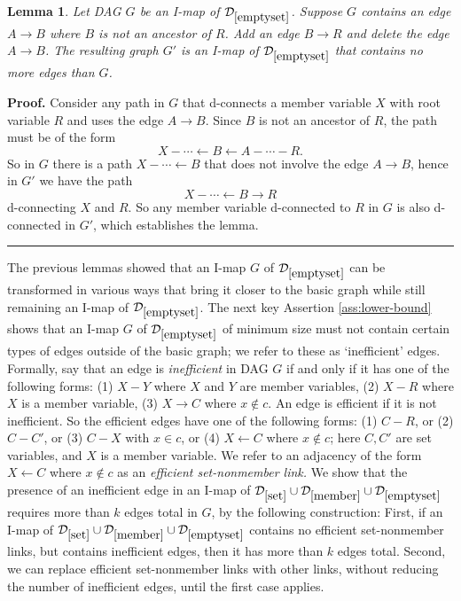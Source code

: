 \documentclass{elsarticle}%
\newtheorem{lemma}[theorem]{Lemma}
\renewenvironment{proof}[1][Proof]{\noindent\textbf{#1.} }{\ \rule{0.5em}{0.5em}}
\newcommand{\A}{A}
\newcommand{\B}{B}
\newcommand{\R}{R}
\newcommand{\X}{X}
\newcommand{\Y}{Y}
\newcommand{\C}{C}
\newcommand{\G}{G}
\newcommand{\D}{\mathcal{D}}
\renewcommand{\c}{c}
\newcommand{\x}{x}
\begin{document}
\begin{lemma} \label{lemma:delete2}
Let DAG $\G$ be an I-map of $\D_{\ref{emptyset}}$. Suppose $\G$ contains an edge $\A \rightarrow \B$ where $\B$ is not an ancestor of $\R$. Add an edge $\B \rightarrow \R$ and delete the edge $\A \rightarrow \B$. The resulting graph $\G'$ is an I-map of $\D_{\ref{emptyset}}$ that contains no more edges than $\G$.
\end{lemma}

\begin{proof}
Consider any path in $\G$ that d-connects a member variable $\X$ with root variable $\R$ and uses the edge $\A \rightarrow \B$. Since $\B$ is not an ancestor of $\R$, the path must be of the form $$\X - \cdots \leftarrow \B \leftarrow \A - \cdots - \R.$$ So in $\G$ there is a path $\X -\cdots  \leftarrow \B$ that does not involve the edge $\A \rightarrow \B$, hence in $\G'$ we have the path $$\X -\cdots  \leftarrow \B \rightarrow \R$$ d-connecting $\X$ and $\R$. So any member variable d-connected to $R$ in $G$ is also d-connected in $\G'$, which establishes the lemma.
\end{proof}

The previous lemmas showed that an I-map $\G$ of $\D_{\ref{emptyset}}$ can be transformed in various ways that bring it closer to the basic graph while still remaining an I-map of $\D_{\ref{emptyset}}$. The next key Assertion \ref{ass:lower-bound} shows that an I-map $\G$ of $\D_{\ref{emptyset}}$ of minimum size must not contain certain types of edges outside of the basic graph; we refer to these as `inefficient' edges. Formally, say that an edge is {\em inefficient} in DAG $\G$ if and only if it has one of the following forms: (1) $\X - \Y$ where $\X$ and $\Y$ are member variables, (2) $\X - \R$ where $\X$ is a member variable, (3) $\X \rightarrow \C$ where $\x \not\in \c$. An edge is efficient if it is not inefficient. So the efficient edges have one of the following forms: (1) $\C - \R$, or (2) $\C - \C'$, or (3) $\C - \X$ with $\x \in \c$, or (4) $\X \leftarrow \C$ where $\x \not\in \c$; here $\C,\C'$ are set variables, and $\X$ is a member variable. We refer to an adjacency of the form $\X \leftarrow \C$ where $\x \not\in \c$ as an {\em efficient set-nonmember link.} We show that the presence of an inefficient edge in an I-map of $\D_{\ref{set}}\cup \D_{\ref{member}}\cup
\D_{\ref{emptyset}}$ requires more than $k$ edges total in $\G$, by the following construction: First, if an I-map of $\D_{\ref{set}}\cup \D_{\ref{member}}\cup
\D_{\ref{emptyset}}$ contains no efficient set-nonmember links, but contains inefficient edges, then it has more than $k$ edges total. Second,
we can replace efficient set-nonmember links with other links, without reducing the number of inefficient edges, until the first case applies.
\end{document}
